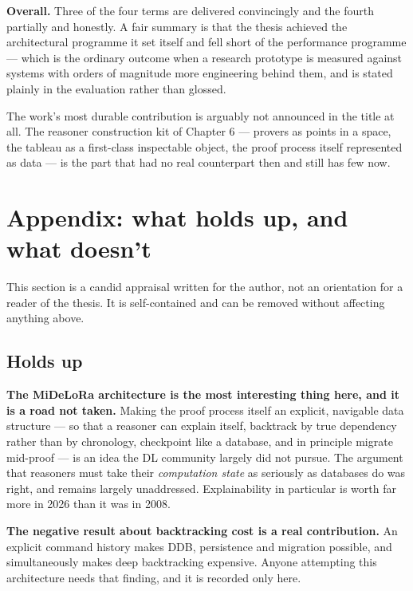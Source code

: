 \documentclass[11pt,a4paper,DIV=12,parskip=half]{scrartcl}
\newenvironment{note}
  {\begin{list}{}{\setlength{\leftmargin}{1.5em}\setlength{\rightmargin}{1.5em}%
                  \setlength{\listparindent}{0pt}}\item[]\small}
  {\end{list}}
\begin{document}
\textbf{Overall.} Three of the four terms are delivered convincingly and the
fourth partially and honestly. A fair summary is that the thesis achieved the
architectural programme it set itself and fell short of the performance
programme --- which is the ordinary outcome when a research prototype is measured
against systems with orders of magnitude more engineering behind them, and is
stated plainly in the evaluation rather than glossed.

The work's most durable contribution is arguably not announced in the title at
all. The reasoner construction kit of Chapter 6 --- provers as points in a space,
the tableau as a first-class inspectable object, the proof process itself
represented as data --- is the part that had no real counterpart then and still
has few now.

\clearpage
\section{Appendix: what holds up, and what doesn't}

\begin{note}
This section is a candid appraisal written for the author, not an orientation for
a reader of the thesis. It is self-contained and can be removed without affecting
anything above.
\end{note}

\subsection{Holds up}

\textbf{The MiDeLoRa architecture is the most interesting thing here, and it is a
road not taken.} Making the proof process itself an explicit, navigable data
structure --- so that a reasoner can explain itself, backtrack by true dependency
rather than by chronology, checkpoint like a database, and in principle migrate
mid-proof --- is an idea the DL community largely did not pursue. The argument
that reasoners must take their \emph{computation state} as seriously as databases
do was right, and remains largely unaddressed. Explainability in particular is
worth far more in 2026 than it was in 2008.

\textbf{The negative result about backtracking cost is a real contribution.} An
explicit command history makes DDB, persistence and migration possible, and
simultaneously makes deep backtracking expensive. Anyone attempting this
architecture needs that finding, and it is recorded only here.
\end{document}

